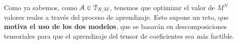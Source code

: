 \begin{observacion}
    Como ya sabemos, como $\mathcal{A} \in \mathcal{T}_{N, M}$, tenemos que optimizar el valor de $M^N$ valores reales a través del proceso de aprendizaje. Esto supone un reto, que \textbf{motiva el uso de los dos modelos}, que se basarán en descomposiciones tensoriales para que el aprendizaje del tensor de coeficientes sea más factible.
\end{observacion}

\endinput
